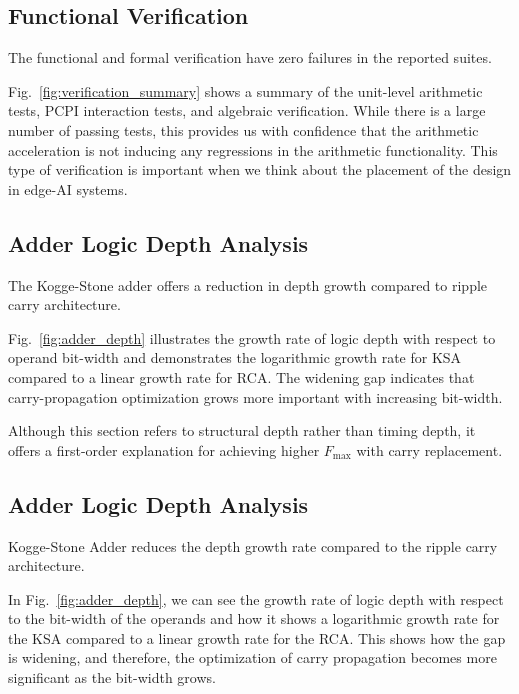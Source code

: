 \subsection{Functional Verification}
The functional and formal verification have zero failures in the reported suites.

Fig.~\ref{fig:verification_summary} shows a summary of the unit-level arithmetic tests, PCPI interaction tests, and algebraic verification. While there is a large number of passing tests, this provides us with confidence that the arithmetic acceleration is not inducing any regressions in the arithmetic functionality. This type of verification is important when we think about the placement of the design in edge-AI systems.




\subsection{Adder Logic Depth Analysis}
The Kogge-Stone adder offers a reduction in depth growth compared to ripple carry architecture.

Fig.~\ref{fig:adder_depth} illustrates the growth rate of logic depth with respect to operand bit-width and demonstrates the logarithmic growth rate for KSA compared to a linear growth rate for RCA. The widening gap indicates that carry-propagation optimization grows more important with increasing bit-width.

Although this section refers to structural depth rather than timing depth, it offers a first-order explanation for achieving higher $F_{\max}$ with carry replacement.



\subsection{Adder Logic Depth Analysis}
Kogge-Stone Adder reduces the depth growth rate compared to the ripple carry architecture.

In Fig.~\ref{fig:adder_depth}, we can see the growth rate of logic depth with respect to the bit-width of the operands and how it shows a logarithmic growth rate for the KSA compared to a linear growth rate for the RCA. This shows how the gap is widening, and therefore, the optimization of carry propagation becomes more significant as the bit-width grows.

